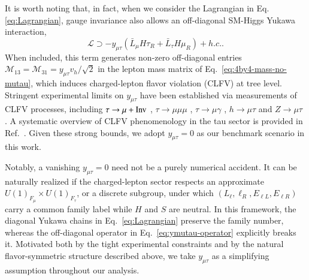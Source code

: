 \documentclass[onecolumn, aps, nofootinbib, prd, preprint, floats, floatfix, amsmath, amssymb, superscriptaddress, preprintnumbers]{revtex4-1}
\begin{document}
It is worth noting that, in fact, when we consider the Lagrangian in Eq. \eqref{eq:Lagrangian}, gauge invariance also allows an off-diagonal SM-Higgs Yukawa interaction,
\begin{equation}
    \mathcal{L}\supset
    -y_{\mu\tau}(\bar{L}_{\mu}H \tau_R + \bar{L}_{\tau}H \mu_R)+h.c. .
\label{eq:ymutau-operator}
\end{equation}
When included, this term generates non-zero off-diagonal entries $\mathcal{M}_{13}=\mathcal{M}_{31}=y_{\mu\tau}v_h/\sqrt{2}$ in the lepton mass matrix of Eq.~\eqref{eq:4by4-mass-no-mutau}, which induces charged-lepton flavor violation (CLFV) at tree level. Stringent experimental limits on $y_{\mu\tau}$ have been established via measurements of CLFV processes, including $\tau\to\mu +{\rm Inv}$ \cite{Ibarra:2021xyk}, $\tau\to\mu \mu\mu$ \cite{Ibarra:2021xyk,Hayasaka:2010np,Belle-II:2024sce}, $\tau\to \mu\gamma$ \cite{Belle:2021ysv}, $h\to\mu\tau$ \cite{Harnik:2012pb,CMS:2021rsq} and $Z\to \mu\tau$ \cite{ATLAS:2021bdj}.
A systematic overview of CLFV phenomenology in the tau sector is provided in Ref.~\cite{Banerjee:2022xuw}. Given these strong bounds, we adopt $y_{\mu\tau}=0$ as our benchmark scenario in this work.

Notably, a vanishing $y_{\mu\tau}=0$ need not be a purely numerical accident. It can be naturally realized if the charged-lepton sector respects an approximate $U(1)_{F_\mu}\times U(1)_{F_\tau}$, or a discrete subgroup, under which $(L_\ell,\ell_R,E_{\ell L},E_{\ell R})$ carry a common family label while $H$ and $S$ are neutral. In this framework, the diagonal Yukawa chains in Eq.~\eqref{eq:Lagrangian} preserve the family number, whereas the off-diagonal operator in Eq.~\eqref{eq:ymutau-operator} explicitly breaks it. Motivated both by the tight experimental constraints and by the natural flavor-symmetric structure described above, we take $y_{\mu\tau}$ as a simplifying assumption throughout our analysis.
\end{document}
